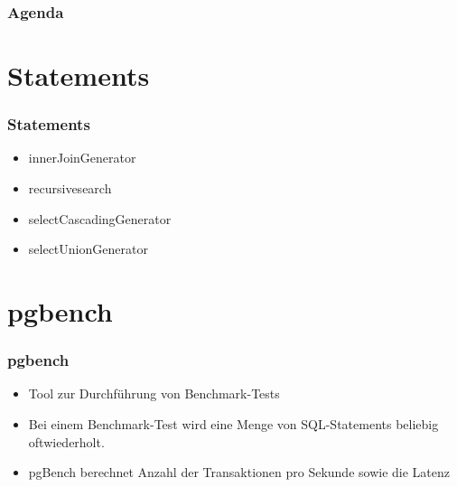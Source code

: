 \documentclass[hyperref={pdfpagelabels=false}]{beamer}
\author{Jennifer Wittling, Rolf Kimmelmann, Jan Löffelsender}
\title{\tit}
\begin{document}

	\begin{frame}
	\titlepage
	\end{frame} 

	\begin{frame}
	\frametitle{Agenda}
	\hypertarget{tableofcontent}{}
	\tableofcontents
	\end{frame}

	\section{Statements}
	\begin{frame}
	\frametitle{Statements}
	\begin{itemize}
		\item innerJoinGenerator
		\item recursivesearch
		\item selectCascadingGenerator
		\item selectUnionGenerator
	\end{itemize}
	\end{frame}

	\section{pgbench}
	\begin{frame}
	\frametitle{pgbench}
    \begin{itemize}
			\item Tool zur Durchführung von Benchmark-Tests
			\item Bei einem Benchmark-Test wird eine Menge von SQL-Statements beliebig oftwiederholt.
			\item pgBench berechnet Anzahl der Transaktionen pro Sekunde sowie die Latenz
	\end{itemize}	
	\end{frame}
\end{document}
